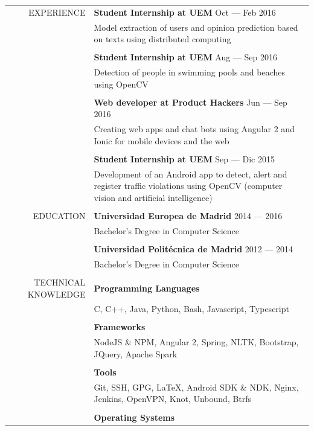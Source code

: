 \documentclass[a4paper, 11pt]{article}
\begin{document}
    \begin{longtable}{rp{11cm}}
        EXPERIENCE
        & {\bf Student Internship at UEM} \hfill Oct --- Feb 2016\\
        & Model extraction of users and opinion prediction based on texts using distributed computing\\\\
        & {\bf Student Internship at UEM} \hfill Aug --- Sep 2016\\
        & Detection of people in swimming pools and beaches using OpenCV\\\\
        & {\bf Web developer at Product Hackers} \hfill Jun --- Sep 2016\\
        & Creating web apps and chat bots using Angular 2 and Ionic for mobile devices and the web\\\\
        & {\bf Student Internship at UEM} \hfill Sep --- Dic 2015\\
        &  Development of an Android app to detect, alert and register traffic violations using OpenCV (computer vision and artificial intelligence)\\
        \\
        EDUCATION
        & {\bf Universidad Europea de Madrid} \hfill 2014 --- 2016\\
        & Bachelor's Degree in Computer Science\\\\
        & {\bf Universidad Politécnica de Madrid} \hfill 2012 --- 2014\\
        & Bachelor's Degree in Computer Science\\\\
        TECHNICAL KNOWLEDGE
        & {\bf Programming Languages}\\
        & C, C++, Java, Python, Bash, Javascript, Typescript\\\\
        & {\bf Frameworks}\\
        & NodeJS \& NPM, Angular 2, Spring, NLTK, Bootstrap, JQuery, Apache Spark\\\\
        & {\bf Tools}\\
        & Git, SSH, GPG, \LaTeX, Android SDK \& NDK, Nginx, Jenkins, OpenVPN, Knot, Unbound, Btrfs\\\\
        & {\bf Operating Systems}\\

\end{longtable}
\end{document}
